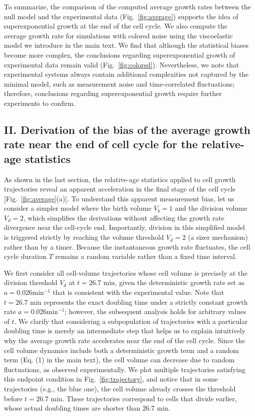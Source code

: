 \documentclass[aps, prl, longbibliography, linenumbers, superscriptaddress]{revtex4-2}
\begin{document}
To summarize, the comparison of the computed average growth rates between the null model and the experimental data (Fig.~\ref{fig:average}) supports the idea of superexponential growth at the end of the cell cycle. We also compute the average growth rate for simulations with colored noise using the viscoelastic model we introduce in the main text. We find that although the statistical biases become more complex, the conclusions regarding superexponential growth of experimental data remain valid (Fig.~\ref{fig:colored}). Nevertheless, we note that experimental systems always contain additional complexities not captured by the minimal model, such as measurement noise and time-correlated fluctuations; therefore, conclusions regarding superexponential growth require further experiments to confirm.

\subsection{II. Derivation of the bias of the average growth rate near the end of cell cycle for the relative-age statistics}
As shown in the last section, the relative-age statistics applied to cell growth trajectories reveal an apparent acceleration in the final stage of the cell cycle [Fig.~\ref{fig:average}(a)]. To understand this apparent measurement bias, let us consider a simpler model where the birth volume $V_b=1$ and the division volume $V_d=2$, which simplifies the derivations without affecting the growth rate divergence near the cell-cycle end. Importantly, division in this simplified model is triggered strictly by reaching the volume threshold $V_d = 2$ (a sizer mechanism) rather than by a timer. Because the instantaneous growth rate fluctuates, the cell cycle duration $T$ remains a random variable rather than a fixed time interval.

We first consider all cell-volume trajectories whose cell volume is precisely at the division threshold $V_d$ at $t=26.7\text{ min}$, given the deterministic growth rate set as $a=0.026 \text{min}^{-1}$ that is consistent with the experimental value. Note that $t = 26.7\text{ min}$ represents the exact doubling time under a strictly constant growth rate $a=0.026 \text{min}^{-1}$; however, the subsequent analysis holds for arbitrary values of $t$. We clarify that considering a subpopulation of trajectories with a particular doubling time is merely an intermediate step that helps us to explain intuitively why the average growth rate accelerates near the end of the cell cycle. Since the cell volume dynamics include both a deterministic growth term and a random term (Eq. (1) in the main text), the cell volume can decrease due to random fluctuations, as observed experimentally. We plot multiple trajectories satisfying this endpoint condition in Fig.~\ref{fig:trajectory}, and notice that in some trajectories (e.g., the blue one), the cell volume already crosses the threshold before $t=26.7\text{ min}$. These trajectories correspond to cells that divide earlier, whose actual doubling times are shorter than $26.7\text{ min}$.
\end{document}

